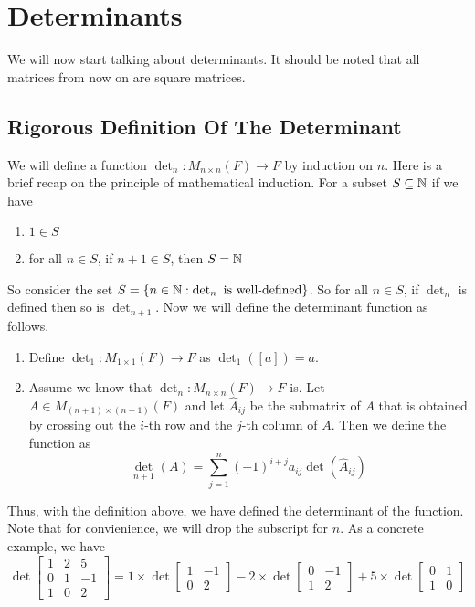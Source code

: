 \documentclass[main.tex]{subfiles}
\begin{document}
    \chapter{Determinants}  

    We will now start talking about determinants. It should be noted that all matrices from now on are square matrices. 

    \section{Rigorous Definition Of The Determinant}
    We will define a function $\det_n: M_{n\times n}\left(F \right) \to F$ by induction on $n$. Here is a brief recap on the principle of mathematical induction. For a subset $S\subseteq \mathbb{N}$ if we have 
    \begin{enumerate}
        \item $1\in S$ 
        \item for all $n\in S$, if $n+1\in S$, then $S = \mathbb{N}$
    \end{enumerate}
    So consider the set $S = \{n\in \mathbb{N} : \det_n \text{ is well-defined} \}$. So for all $n\in S$, if $\det_n$ is defined then so is $\det_{n+1}$. Now we will define the determinant function as follows. 
    \begin{enumerate}
        \item Define $\det_1 : M_{1\times 1}(F) \to F$ as $\det_1 \left( [a] \right) = a$. 

        \item Assume we know that $\det_n : M_{n\times n}(F) \to F$ is. Let $A\in M_{(n+1)\times (n+1)}(F)$ and let $\hat{A}_{ij}$ be the submatrix of $A$ that is obtained by crossing out the $i$-th row and the $j$-th column of $A$. Then we define the function as 
            \begin{equation*}
                \det_{n+1} (A) = \sum_{j=1}^{n} (-1)^{i+j} a_{ij} \det \left( \hat{A}_{ij} \right)
            \end{equation*}
    \end{enumerate}
    Thus, with the definition above, we have defined the determinant of the function. Note that for convienience, we will drop the subscript for $n$. As a concrete example, we have 
    \begin{equation*}
            \det \begin{bmatrix}
                1 & 2 & 5 \\ 0 & 1 & -1 \\ 1 & 0 & 2 
            \end{bmatrix} = 1\times \det \begin{bmatrix}
                1 & -1 \\ 0 & 2 
            \end{bmatrix} - 2 \times \det \begin{bmatrix}
                0 & -1 \\ 1 & 2 
            \end{bmatrix} + 5 \times \det \begin{bmatrix}
                0 & 1 \\ 1 & 0 
            \end{bmatrix}
    \end{equation*}
\end{document}
